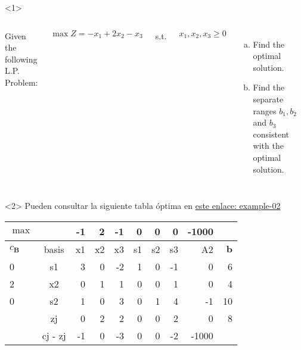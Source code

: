 \begin{frameExample}{}{}
  \begin{onlyenv}<1>
    \begin{columns}
  Given the following L.P. Problem:

  \[ \max Z = -x_1 + 2x_2 - x_3 \]

  \vspace{6mm}
  s.t.

  \vspace{6mm}

  $x_1, x_2, x_3 \geq 0$
  \begin{enumerate}[a)] \justifying \parskip3mm
  \item Find the optimal solution.
  \item   Find the separate ranges $b_1, b_2 $ and $b_3$ consistent with the optimal solution.
  \end{enumerate}
\end{columns}
  \end{onlyenv}

\begin{onlyenv}<2>
  Pueden consultar la siguiente tabla óptima en \href{https://docs.google.com/spreadsheets/d/1JT75Ab_TDRVXaCAAX_1QM6zrGAm2IP5p3ISB_nuJ5Zg/edit?usp=sharing}{este enlace: example-02}
  \begin{table}[!ht]
    \centering
    \begin{tabular}{lc|rrrrrrr|r}
\toprule    
      $\max$ & ~ & -1 & 2 & -1 & 0 & 0 & 0 & -1000 & ~ \\
      \midrule
      $c_{\boldsymbol{B}}$ & basis & x1 & x2 & x3 & s1 & s2 & s3 & A2 & $\boldsymbol{b}$ \\
      \midrule
        0 & s1 & 3 & 0 & -2 & 1 & 0 & -1 & 0 & 6 \\ 
        2 & x2 & 0 & 1 & 1 & 0 & 0 & 1 & 0 & 4 \\ 
      0 & s2 & 1 & 0 & 3 & 0 & 1 & 4 & -1 & 10 \\
      \midrule
        ~ & zj & 0 & 2 & 2 & 0 & 0 & 2 & 0 & 8 \\ 
      ~ & cj - zj & -1 & 0 & -3 & 0 & 0 & -2 & -1000 \\
      \bottomrule
    \end{tabular}
\end{table}
\end{onlyenv}
\end{frameExample}


